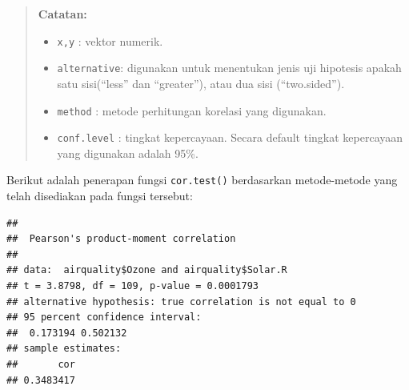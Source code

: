 \documentclass[]{book}
\newenvironment{Shaded}{\begin{snugshade}}{\end{snugshade}}
\newcommand{\CommentTok}[1]{\textcolor[rgb]{0.56,0.35,0.01}{\textit{#1}}}
\newcommand{\DataTypeTok}[1]{\textcolor[rgb]{0.13,0.29,0.53}{#1}}
\newcommand{\KeywordTok}[1]{\textcolor[rgb]{0.13,0.29,0.53}{\textbf{#1}}}
\newcommand{\NormalTok}[1]{#1}
\newcommand{\OperatorTok}[1]{\textcolor[rgb]{0.81,0.36,0.00}{\textbf{#1}}}
\newcommand{\StringTok}[1]{\textcolor[rgb]{0.31,0.60,0.02}{#1}}
\providecommand{\tightlist}{%
  \setlength{\itemsep}{0pt}\setlength{\parskip}{0pt}}
\theoremstyle{definition}
\theoremstyle{definition}
\theoremstyle{definition}
\theoremstyle{remark}
\begin{document}
\begin{quote}
\textbf{Catatan:}

\begin{itemize}
\tightlist
\item
  \texttt{x,y} : vektor numerik.
\item
  \texttt{alternative}: digunakan untuk menentukan jenis uji hipotesis apakah satu sisi(``less'' dan ``greater''), atau dua sisi (``two.sided'').
\item
  \texttt{method} : metode perhitungan korelasi yang digunakan.
\item
  \texttt{conf.level} : tingkat kepercayaan. Secara default tingkat kepercayaan yang digunakan adalah 95\%.
\end{itemize}
\end{quote}

Berikut adalah penerapan fungsi \texttt{cor.test()} berdasarkan metode-metode yang telah disediakan pada fungsi tersebut:

\begin{Shaded}
\end{Shaded}

\begin{verbatim}
## 
##  Pearson's product-moment correlation
## 
## data:  airquality$Ozone and airquality$Solar.R
## t = 3.8798, df = 109, p-value = 0.0001793
## alternative hypothesis: true correlation is not equal to 0
## 95 percent confidence interval:
##  0.173194 0.502132
## sample estimates:
##       cor 
## 0.3483417
\end{verbatim}

\begin{Shaded}
\end{Shaded}
\end{document}
